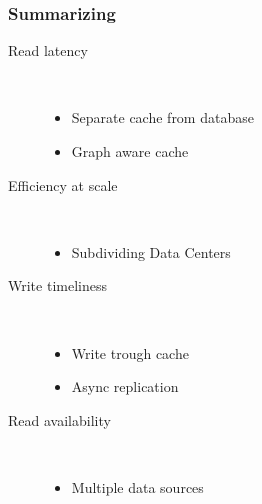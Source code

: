 \begin{frame}[c]\frametitle{Summarizing}
\begin{description}
	\item[Read latency] \hfill\\
	\begin{itemize}
		\item Separate cache from database
		\item Graph aware cache
	\end{itemize}
	\item[Efficiency at scale] \hfill\\
	\begin{itemize}
		\item Subdividing Data Centers
	\end{itemize}
	\item[Write timeliness]\hfill\\
	\begin{itemize}
		\item Write trough cache
		\item Async replication
	\end{itemize}
	\item[Read availability]\hfill\\
	\begin{itemize}
		\item Multiple data sources
	\end{itemize}
\end{description}


\end{frame}